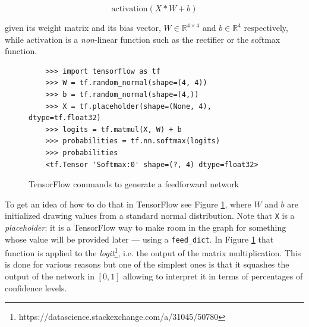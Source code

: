 \[ \text{activation}(X * W + b) \]

given its weight matrix and its bias vector, \( W \in \mathbb{R}^{4
  \times 4} \) and \( b \in \mathbb{R}^{4}\) respectively, while
\( \text{activation} \) is a \emph{non}-linear function such as
the rectifier or the softmax function.

\begin{figure}
  \begin{verbatim}
    >>> import tensorflow as tf
    >>> W = tf.random_normal(shape=(4, 4))
    >>> b = tf.random_normal(shape=(4,))
    >>> X = tf.placeholder(shape=(None, 4), dtype=tf.float32)
    >>> logits = tf.matmul(X, W) + b
    >>> probabilities = tf.nn.softmax(logits)
    >>> probabilities
    <tf.Tensor 'Softmax:0' shape=(?, 4) dtype=float32>
  \end{verbatim}
  \caption{TensorFlow commands to generate a feedforward network}
  \label{fig:tensorflow-feedforward}
\end{figure}

To get an idea of how to do that in TensorFlow see Figure
\ref{fig:tensorflow-feedforward}, where $W$ and $b$ are initialized
drawing values from a standard normal distribution. Note that
\texttt{X} is a \emph{placeholder}: it is a TensorFlow way to make room
in the graph for something whose value will be provided later --- using
a \texttt{feed\_dict}. In
Figure \ref{fig:tensorflow-feedforward} that function is applied to the
\emph{logit}\footnote{https://datascience.stackexchange.com/a/31045/50780},
i.e. the output of the matrix multiplication. This is done for various
reasons but one of the simplest ones is that it squashes the output of
the network in $[0,1]$ allowing to interpret it in terms of percentages
of confidence levels.


